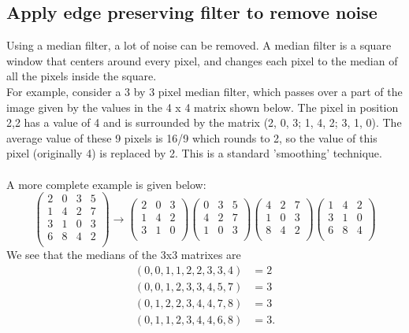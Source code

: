 \documentclass[11pt,fleqn]{article}
\begin{document}
\subsection{Apply edge preserving filter to remove noise}
Using a median filter, a lot of noise can be removed. A median filter is a square window that centers around every pixel, and changes each pixel to the median of all the pixels inside the square.\\
For example, consider a 3 by 3 pixel median filter, which passes over a part of the image given by the values in the 4 x 4 matrix shown below. The pixel in position 2,2 has a value of 4 and is surrounded by the matrix (2, 0, 3; 1, 4, 2; 3, 1, 0).  The average value of these 9 pixels is 16/9 which rounds to 2, so the value of this pixel (originally 4) is replaced by 2.  This is a standard 'smoothing' technique.  \\
\\
A more complete example is given below:
\[ \left( \begin{array}{cccc}
2 & 0 & 3 & 5 \\
1 & 4 & 2 & 7 \\
3 & 1 & 0 & 3 \\
6 & 8 & 4 & 2 \\ 
\end{array} \right)
\rightarrow
\left(\begin{array}{ccc}
2 & 0 & 3 \\
1 & 4 & 2 \\
3 & 1 & 0 \\
\end{array} \right)
\left(\begin{array}{ccc}
0 & 3 & 5 \\
4 & 2 & 7 \\
1 & 0 & 3 \\
\end{array} \right)
\left(\begin{array}{ccc}
4 & 2 & 7 \\
1 & 0 & 3 \\
8 & 4 & 2 \\
\end{array} \right)
\left(\begin{array}{ccc}
1 & 4 & 2 \\
3 & 1 & 0 \\
6 & 8 & 4 \\
\end{array} \right)\]
We see that the medians of the 3x3 matrixes are
\begin{equation} \label{eq1}
\begin{split}
(0,0,1,1,2,2,3,3,4) &=  2\\
(0,0,1,2,3,3,4,5,7) &=  3\\
(0,1,2,2,3,4,4,7,8) &=  3\\
(0,1,1,2,3,4,4,6,8) &=  3.\\
\end{split}
\end{equation}
\end{document}
